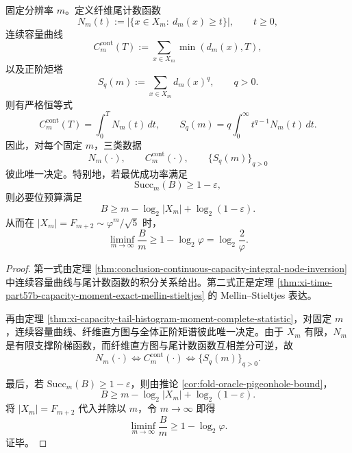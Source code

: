 \begin{theorem}\label{thm:conclusion-tail-capacity-moment-tail-law-equivalence}
固定分辨率 \(m\)。定义纤维尾计数函数
\[
N_m(t):=\bigl|\{x\in X_m:\ d_m(x)\ge t\}\bigr|,
\qquad t\ge 0,
\]
连续容量曲线
\[
C_m^{\mathrm{cont}}(T):=\sum_{x\in X_m}\min(d_m(x),T),
\]
以及正阶矩塔
\[
S_q(m):=\sum_{x\in X_m}d_m(x)^q,
\qquad q>0.
\]
则有严格恒等式
\[
C_m^{\mathrm{cont}}(T)=\int_0^T N_m(t)\,dt,
\qquad
S_q(m)=q\int_0^\infty t^{q-1}N_m(t)\,dt.
\]
因此，对每个固定 \(m\)，三类数据
\[
N_m(\cdot),
\qquad
C_m^{\mathrm{cont}}(\cdot),
\qquad
\{S_q(m)\}_{q>0}
\]
彼此唯一决定。特别地，若最优成功率满足
\[
\mathrm{Succ}_m(B)\ge 1-\varepsilon,
\]
则必要位预算满足
\[
B\ge m-\log_2|X_m|+\log_2(1-\varepsilon).
\]
从而在 \(|X_m|=F_{m+2}\sim \varphi^m/\sqrt5\) 时，
\[
\liminf_{m\to\infty}\frac{B}{m}\ge 1-\log_2\varphi=\log_2\!\frac{2}{\varphi}.
\]
\end{theorem}
\begin{proof}
第一式由定理 \ref{thm:conclusion-continuous-capacity-integral-node-inversion} 中连续容量曲线与尾计数函数的积分关系给出。第二式正是定理 \ref{thm:xi-time-part57b-capacity-moment-exact-mellin-stieltjes} 的 Mellin--Stieltjes 表达。

再由定理 \ref{thm:xi-capacity-tail-histogram-moment-complete-statistic}，对固定 \(m\)，连续容量曲线、纤维直方图与全体正阶矩谱彼此唯一决定。由于 \(X_m\) 有限，\(N_m\) 是有限支撑阶梯函数，而纤维直方图与尾计数函数互相差分可逆，故
\[
N_m(\cdot)
\Longleftrightarrow
C_m^{\mathrm{cont}}(\cdot)
\Longleftrightarrow
\{S_q(m)\}_{q>0}.
\]

最后，若 \(\mathrm{Succ}_m(B)\ge 1-\varepsilon\)，则由推论 \ref{cor:fold-oracle-pigeonhole-bound}，
\[
B\ge m-\log_2|X_m|+\log_2(1-\varepsilon).
\]
将 \(|X_m|=F_{m+2}\) 代入并除以 \(m\)，令 \(m\to\infty\) 即得
\[
\liminf_{m\to\infty}\frac{B}{m}\ge 1-\log_2\varphi.
\]
证毕。
\end{proof}

